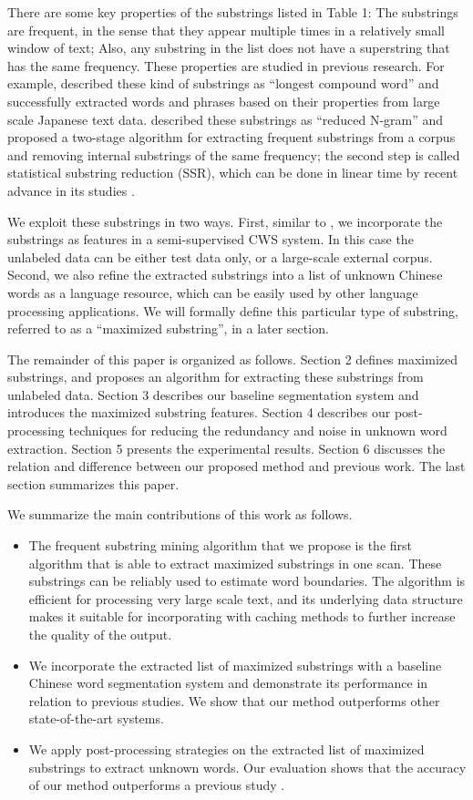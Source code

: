 \documentclass[english]{jnlp_1.4}
\begin{document}
There are some key properties of the substrings listed in Table 1: The substrings are frequent, in the sense that they appear multiple times in a relatively small window of text; Also, any substring in the list does not have a superstring that has the same frequency. These properties are studied in previous research. For example, \cite{nagao1994new} described these kind of substrings as ``longest compound word'' and successfully extracted words and phrases based on their properties from large scale Japanese text data. \cite{lin2001extracting} described these substrings as ``reduced N-gram'' and proposed a two-stage algorithm for extracting frequent substrings from a corpus and removing internal substrings of the same frequency; the second step is called statistical substring reduction (SSR), which can be done in linear time by recent advance in its studies \cite{lu2004statistical}. 

We exploit these substrings in two ways. First, similar to \cite{jiang2010term}, we incorporate the substrings as features in a semi-supervised CWS system. In this case the unlabeled data can be either test data only, or a large-scale external corpus. Second, we also refine the extracted substrings into a list of unknown Chinese words as a language resource, which can be easily used by other language processing applications. We will formally define this particular type of substring, referred to as a ``maximized substring'', in a later section.

The remainder of this paper is organized as follows. Section 2 defines maximized substrings, and proposes an algorithm for extracting these substrings from unlabeled data. Section 3 describes our baseline segmentation system and introduces the maximized substring features. Section 4 describes our post-processing techniques for reducing the redundancy and noise in unknown word extraction. Section 5 presents the experimental results. Section 6 discusses the relation and difference between our proposed method and previous work. The last section summarizes this paper.

We summarize the main contributions of this work as follows. 
\begin{itemize}
\item The frequent substring mining algorithm that we propose is the first algorithm that is able to extract maximized substrings in one scan. These substrings can be reliably used to estimate word boundaries. The algorithm is efficient for processing very large scale text, and its underlying data structure makes it suitable for incorporating with caching methods to further increase the quality of the output.
\item We incorporate the extracted list of maximized substrings with a baseline Chinese word segmentation system and demonstrate its performance in relation to previous studies. We show that our method outperforms other state-of-the-art systems. 
\item We apply post-processing strategies on the extracted list of maximized substrings to extract unknown words. Our evaluation shows that the accuracy of our method outperforms a previous study \cite{feng2004accessor}.
\end{itemize}
\end{document}
